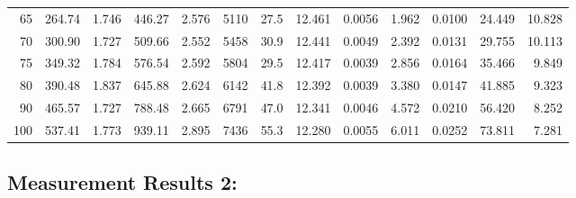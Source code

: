 \documentclass[10pt]{article}
\begin{document}
{\begin{tabular}{|r|rr|rr|rr|rr|rr|r|r|}
       65 &       264.74 &        1.746 &       446.27 &        2.576 &         5110 &         27.5 &       12.461 &       0.0056 &        1.962 &       0.0100 &       24.449 &       10.828 \\
       70 &       300.90 &        1.727 &       509.66 &        2.552 &         5458 &         30.9 &       12.441 &       0.0049 &        2.392 &       0.0131 &       29.755 &       10.113 \\
       75 &       349.32 &        1.784 &       576.54 &        2.592 &         5804 &         29.5 &       12.417 &       0.0039 &        2.856 &       0.0164 &       35.466 &        9.849 \\
       80 &       390.48 &        1.837 &       645.88 &        2.624 &         6142 &         41.8 &       12.392 &       0.0039 &        3.380 &       0.0147 &       41.885 &        9.323 \\
       90 &       465.57 &        1.727 &       788.48 &        2.665 &         6791 &         47.0 &       12.341 &       0.0046 &        4.572 &       0.0210 &       56.420 &        8.252 \\
      100 &       537.41 &        1.773 &       939.11 &        2.895 &         7436 &         55.3 &       12.280 &       0.0055 &        6.011 &       0.0252 &       73.811 &        7.281 \\
\hline
\end{tabular}
}



\subsection*{\large \bf Measurement Results 2:}
\end{document}
